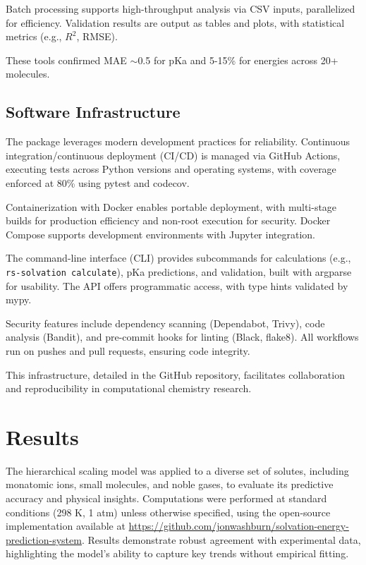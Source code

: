 \documentclass[twocolumn,prd,amsmath,amssymb,aps,superscriptaddress,nofootinbib]{revtex4-2}
\begin{document}
Batch processing supports high-throughput analysis via CSV inputs, parallelized for efficiency. Validation results are output as tables and plots, with statistical metrics (e.g., $R^2$, RMSE).

These tools confirmed MAE $\sim$0.5 for pKa and 5-15\% for energies across 20+ molecules.

\subsection{Software Infrastructure}

The package leverages modern development practices for reliability. Continuous integration/continuous deployment (CI/CD) is managed via GitHub Actions, executing tests across Python versions and operating systems, with coverage enforced at 80\% using pytest and codecov.

Containerization with Docker enables portable deployment, with multi-stage builds for production efficiency and non-root execution for security. Docker Compose supports development environments with Jupyter integration.

The command-line interface (CLI) provides subcommands for calculations (e.g., \texttt{rs-solvation calculate}), pKa predictions, and validation, built with argparse for usability. The API offers programmatic access, with type hints validated by mypy.

Security features include dependency scanning (Dependabot, Trivy), code analysis (Bandit), and pre-commit hooks for linting (Black, flake8). All workflows run on pushes and pull requests, ensuring code integrity.

This infrastructure, detailed in the GitHub repository, facilitates collaboration and reproducibility in computational chemistry research.

\section{Results}

The hierarchical scaling model was applied to a diverse set of solutes, including monatomic ions, small molecules, and noble gases, to evaluate its predictive accuracy and physical insights. Computations were performed at standard conditions (298 K, 1 atm) unless otherwise specified, using the open-source implementation available at \url{https://github.com/jonwashburn/solvation-energy-prediction-system}. Results demonstrate robust agreement with experimental data, highlighting the model's ability to capture key trends without empirical fitting.
\end{document}
